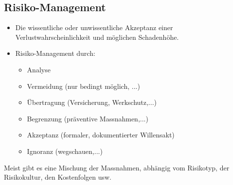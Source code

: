\documentclass[a4paper, 10pt]{article}
\begin{document}
\subsection{Risiko-Management}
\begin{itemize}
	\item Die wissentliche oder unwissentliche Akzeptanz einer Verlustwahrscheinlichkeit und möglichen Schadenhöhe.
	\item Risiko-Management durch:
		\begin{itemize}
			\item Analyse
			\item Vermeidung (nur bedingt möglich, ...)
			\item \"Ubertragung (Versicherung, Werkschutz,...)
			\item Begrenzung (präventive Massnahmen,...)
			\item Akzeptanz (formaler, dokumentierter Willensakt)
			\item Ignoranz (wegschauen,...)
		\end{itemize}
\end{itemize}
Meist gibt es eine Mischung der Massnahmen, abhängig vom Risikotyp, der Risikokultur, den Kostenfolgen usw.
\end{document}
